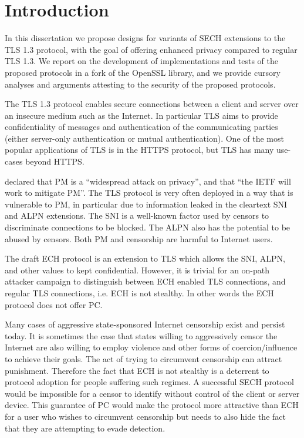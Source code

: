 \chapter{Introduction}


In this dissertation we propose designs
for variants of \ac{SECH} extensions
to the \ac{TLS} 1.3 protocol,
with the goal of offering enhanced
privacy compared to regular \ac{TLS} 1.3.
We report on the development
of implementations and tests of the proposed protocols
in a fork of the OpenSSL library,
and we provide cursory analyses and arguments
attesting to the security of the
proposed protocols.

The \ac{TLS} 1.3 protocol enables secure connections between
a client and server over an insecure medium such as the Internet.
In particular \ac{TLS} aims to provide confidentiality of messages
and authentication of the communicating parties (either server-only authentication
or mutual authentication).
One of the most popular applications of \ac{TLS} is
in the \ac{HTTPS} protocol,
but \ac{TLS} has many use-cases beyond \ac{HTTPS}.

\cite{rfc7258-pervasive-monitoring} declared that \ac{PM} is a ``widespread attack on privacy'', and
that ``the \ac{IETF} will work to mitigate \ac{PM}''.
The \ac{TLS} protocol is very often
deployed in a way that is vulnerable
to \ac{PM}, in particular due to
information leaked in the cleartext \ac{SNI} and
\ac{ALPN} extensions.
The \ac{SNI} is a well-known factor used
by censors to discriminate connections to be blocked.
The \ac{ALPN} also has the potential
to be abused by censors.
Both \ac{PM} and censorship are harmful to Internet users.

The draft \ac{ECH} protocol \citep{esni} is an
extension to \ac{TLS} which allows the \ac{SNI}, \ac{ALPN},
and other values to kept confidential.
However, it is trivial for an on-path attacker
campaign to distinguish between \ac{ECH} enabled \ac{TLS} connections, and regular \ac{TLS} connections,
i.e. \ac{ECH} is not stealthy.
In other words the \ac{ECH} protocol does not offer \ac{PC}.

Many cases of aggressive state-sponsored Internet censorship exist and persist today.
It is sometimes the case that states willing to aggressively censor the Internet
are also willing to employ violence and other forms of coercion/influence to achieve their goals.
The act of trying to circumvent censorship
can attract punishment.
Therefore the fact that \ac{ECH} is not stealthy
is a deterrent to protocol adoption for people suffering such
regimes.
A successful \ac{SECH} protocol would be impossible for
a censor to identify without control of the client or server device.
This guarantee of \ac{PC} would make the protocol more
attractive than \ac{ECH} for a user who
wishes to circumvent censorship but
needs to also hide the fact that they are attempting to evade
detection.

